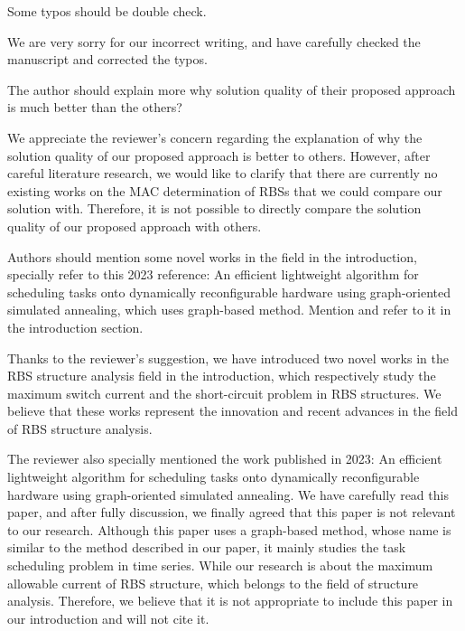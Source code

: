 \begin{revcomment}
  Some typos should be double check.
\end{revcomment}
\begin{revresponse}

We are very sorry for our incorrect writing, and have carefully checked the manuscript and corrected the typos. 
  
\end{revresponse}

\begin{revcomment}
  The author should explain more why solution quality of their proposed approach is much better than the others?
\end{revcomment}
\begin{revresponse}

We appreciate the reviewer's concern regarding the explanation of why the solution quality of our proposed approach is better to others. 
However, after careful literature research, we would like to clarify that there are currently no existing works on the MAC determination of RBSs that we could compare our solution with. 
Therefore, it is not possible to directly compare the solution quality of our proposed approach with others.
  
\end{revresponse}

\begin{revcomment}
  Authors should mention some novel works in the field in the introduction, specially refer to this 2023 reference: An efficient lightweight algorithm for scheduling tasks onto dynamically reconfigurable hardware using graph-oriented simulated annealing, which uses graph-based method. Mention and refer to it in the introduction section.
\end{revcomment}
\begin{revresponse}

Thanks to the reviewer's suggestion, we have introduced two novel works in the RBS structure analysis field in the introduction, which respectively study the maximum switch current \cite{han2021analysis} and the short-circuit problem \cite{chenSneakCircuitTheory2021} in RBS structures.
We believe that these works represent the innovation and recent advances in the field of RBS structure analysis.


The reviewer also specially mentioned the work published in 2023: An efficient lightweight algorithm for scheduling tasks onto dynamically reconfigurable hardware using graph-oriented simulated annealing.
We have carefully read this paper, and after fully discussion, we finally agreed that this paper is not relevant to our research.
Although this paper uses a graph-based method, whose name is similar to the method described in our paper, it mainly studies the task scheduling problem in time series.
While our research is about the maximum allowable current of RBS structure, which belongs to the field of structure analysis.
Therefore, we believe that it is not appropriate to include this paper in our introduction and will not cite it.
  
\end{revresponse}

